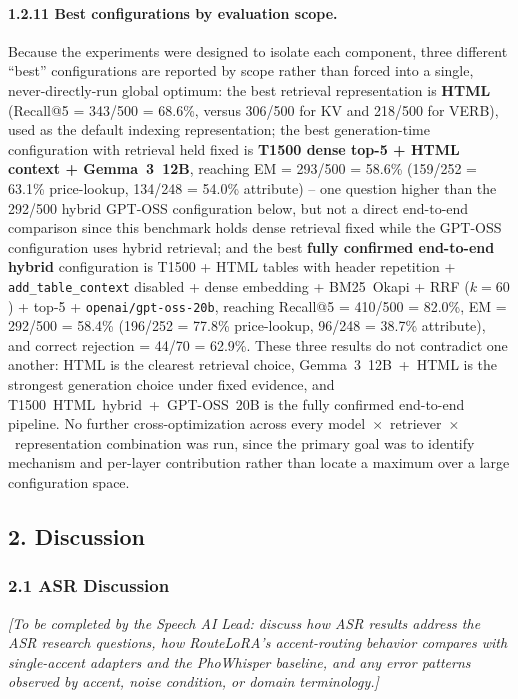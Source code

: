 \documentclass[11pt,a4paper]{article}
\newcommand{\guidance}[1]{%
  {\color{guidanceblue}\itshape [#1]\par}%
}
\begin{document}
\paragraph{1.2.11 Best configurations by evaluation scope.}
Because the experiments were designed to isolate each component, three
different ``best'' configurations are reported by scope rather than forced
into a single, never-directly-run global optimum: the best retrieval
representation is \textbf{HTML} (Recall@5 = 343/500 = 68.6\%, versus 306/500
for KV and 218/500 for VERB), used as the default indexing representation;
the best generation-time configuration with retrieval held fixed is
\textbf{T1500 dense top-5 + HTML context + Gemma~3~12B}, reaching EM =
293/500 = 58.6\% (159/252 = 63.1\% price-lookup, 134/248 = 54.0\% attribute)
-- one question higher than the 292/500 hybrid GPT-OSS configuration below,
but not a direct end-to-end comparison since this benchmark holds dense
retrieval fixed while the GPT-OSS configuration uses hybrid retrieval; and
the best \textbf{fully confirmed end-to-end hybrid} configuration is T1500 +
HTML tables with header repetition + \texttt{add\_table\_context} disabled +
dense embedding + BM25~Okapi + RRF ($k=60$) + top-5 + \texttt{openai/gpt-oss-20b},
reaching Recall@5 = 410/500 = 82.0\%, EM = 292/500 = 58.4\% (196/252 = 77.8\%
price-lookup, 96/248 = 38.7\% attribute), and correct rejection = 44/70 =
62.9\%. These three results do not contradict one another: HTML is the
clearest retrieval choice, Gemma~3~12B~+~HTML is the strongest generation
choice under fixed evidence, and T1500~HTML~hybrid~+~GPT-OSS~20B is the
fully confirmed end-to-end pipeline. No further cross-optimization across
every model~$\times$~retriever~$\times$~representation combination was run,
since the primary goal was to identify mechanism and per-layer contribution
rather than locate a maximum over a large configuration space.

\subsection{2. Discussion}

\subsubsection{2.1 ASR Discussion}
\guidance{To be completed by the Speech AI Lead: discuss how ASR results
address the ASR research questions, how RouteLoRA's accent-routing behavior
compares with single-accent adapters and the PhoWhisper baseline, and any
error patterns observed by accent, noise condition, or domain terminology.}
\end{document}
